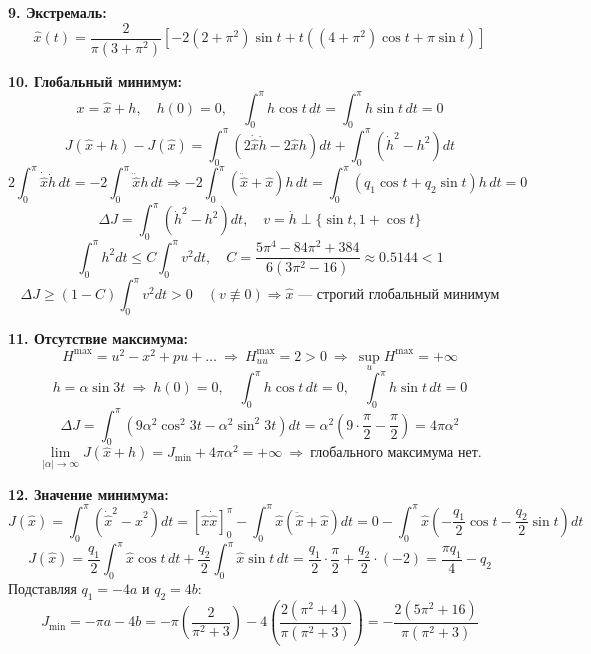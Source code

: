 \documentclass[12pt,a4paper]{article}
\begin{document}
\noindent
\textbf{9. Экстремаль:}
\[
\hat{x}(t) = \frac{2}{\pi(3+\pi^2)} \left[ -2(2+\pi^2)\sin t + t\left((4+\pi^2)\cos t + \pi\sin t\right) \right]
\]

\vspace{0.3cm}
\noindent
\textbf{10. Глобальный минимум:}
\[
x = \hat{x} + h, \quad h(0) = 0, \quad \int_0^\pi h \cos t \, dt = \int_0^\pi h \sin t \, dt = 0
\]
\[
J(\hat{x}+h) - J(\hat{x}) = \int_0^\pi (2\dot{\hat{x}}\dot{h} - 2\hat{x}h) dt + \int_0^\pi (\dot{h}^2 - h^2) dt
\]
\[
2\int_0^\pi \dot{\hat{x}}\dot{h} \, dt = -2\int_0^\pi \ddot{\hat{x}}h \, dt \Rightarrow -2\int_0^\pi (\ddot{\hat{x}} + \hat{x})h \, dt = \int_0^\pi (q_1 \cos t + q_2 \sin t)h \, dt = 0
\]
\[
\Delta J = \int_0^\pi (\dot{h}^2 - h^2) dt, \quad v = \dot{h} \perp \{\sin t, 1+\cos t\}
\]
\[
\int_0^\pi h^2 dt \le C \int_0^\pi v^2 dt, \quad C = \frac{5\pi^4-84\pi^2+384}{6(3\pi^2-16)} \approx 0.5144 < 1
\]
\[
\Delta J \ge (1-C)\int_0^\pi v^2 dt > 0 \quad (v \not\equiv 0) \Rightarrow \hat{x} \text{ — строгий глобальный минимум}
\]

\vspace{0.3cm}
\noindent
\textbf{11. Отсутствие максимума:}
\[
H^{\max} = u^2 - x^2 + pu + \dots \ \Rightarrow \ H^{\max}_{uu} = 2 > 0 \ \Rightarrow \ \sup_{u} H^{\max} = +\infty
\]
\[
h = \alpha \sin 3t \ \Rightarrow \ h(0) = 0, \quad \int_0^\pi h \cos t \, dt = 0, \quad \int_0^\pi h \sin t \, dt = 0
\]
\[
\Delta J = \int_0^\pi (9\alpha^2\cos^2 3t - \alpha^2\sin^2 3t) dt = \alpha^2 \left( 9 \cdot \frac{\pi}{2} - \frac{\pi}{2} \right) = 4\pi\alpha^2
\]
\[
\lim_{|\alpha|\to\infty} J(\hat{x}+h) = J_{\min} + 4\pi\alpha^2 = +\infty \ \Rightarrow \ \text{глобального максимума нет.}
\]

\vspace{0.3cm}
\noindent
\textbf{12. Значение минимума:}
\[
J(\hat{x}) = \int_0^\pi (\dot{\hat{x}}^2 - \hat{x}^2) dt = [\hat{x}\dot{\hat{x}}]_0^\pi - \int_0^\pi \hat{x}(\ddot{\hat{x}} + \hat{x}) dt = 0 - \int_0^\pi \hat{x}\left(-\frac{q_1}{2}\cos t - \frac{q_2}{2}\sin t\right) dt
\]
\[
J(\hat{x}) = \frac{q_1}{2} \int_0^\pi \hat{x}\cos t \, dt + \frac{q_2}{2} \int_0^\pi \hat{x}\sin t \, dt = \frac{q_1}{2} \cdot \frac{\pi}{2} + \frac{q_2}{2} \cdot (-2) = \frac{\pi q_1}{4} - q_2
\]
Подставляя \(q_1 = -4a\) и \(q_2 = 4b\):
\[
J_{\min} = -\pi a - 4b = -\pi\left(\frac{2}{\pi^2+3}\right) - 4\left(\frac{2(\pi^2+4)}{\pi(\pi^2+3)}\right) = -\frac{2(5\pi^2+16)}{\pi(\pi^2+3)}
\]

\vspace{0.5cm}
\end{document}

